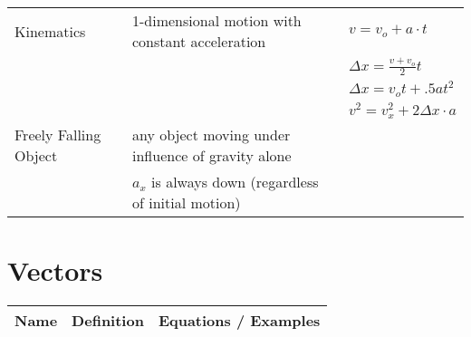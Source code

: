 \documentclass[11pt]{article}
\begin{document}
\begin{tabularx}{\textwidth}{l| X l}
    Kinematics                 & 1-dimensional motion with constant acceleration        & $  v= v_{o} + a \cdot t $  \\*                                                                                     &  & $  \Delta x = \frac{v + v_{o}}{2}t $ \\* &  & $ \Delta x = v_{o}t + .5at^{2} $ \\* &  & $ v^{2} = v^{2}_{x}+ 2\Delta x \cdot a$ \bigstrut \\ \hline
    Freely Falling Object      & any object moving under influence of gravity alone \\* & $ a_{x} $ is always down (regardless of initial motion) \\ \hline
\end{tabularx}

\section{Vectors}
\begin{tabularx}{\textwidth}{l| X l}
    Name & Definition & Equations / Examples \\ \hline
\end{tabularx}
\end{document}

